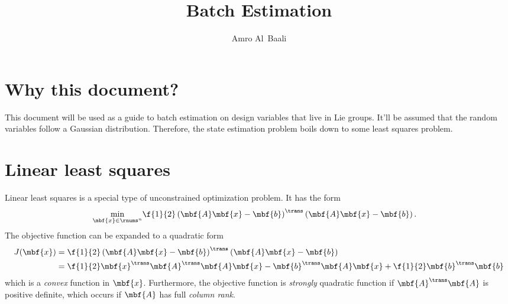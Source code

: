 \documentclass[ nobib, nofonts, notoc]{tufte-handout}
\title{Batch Estimation}
\author{Amro Al~Baali}
\begin{document}
    {    
        
        \tableofcontents
        \clearpage
    }

    \section{Why this document?}
    This document will be used as a guide to batch estimation on design variables that live in Lie groups. It'll be assumed that the random variables follow a Gaussian distribution. Therefore, the state estimation problem boils down to some least squares problem.

    \section{Linear least squares}
    Linear least squares is a special type of unconstrained optimization problem. It has the form
    \begin{align}
        \label{eq:optim problem linear least squares}
        \min_{\mbf{x}\in\rnums^{n}} 
        &\f{1}{2}\left( \mbf{A} \mbf{x} - \mbf{b} \right)^{\trans}\left( \mbf{A}\mbf{x} - \mbf{b} \right).
    \end{align}
    The objective function can be expanded to a quadratic form
    \begin{align}
        J(\mbf{x}) 
        &= \f{1}{2}\left( \mbf{A} \mbf{x} - \mbf{b} \right)^{\trans}\left( \mbf{A}\mbf{x} - \mbf{b} \right)\\
        &= \f{1}{2}\mbf{x}^{\trans}\mbf{A}^{\trans}\mbf{A}\mbf{x} - \mbf{b}^{\trans}\mbf{A}\mbf{x} + \f{1}{2}\mbf{b}^{\trans}\mbf{b}
    \end{align}
    which is a \emph{convex} function in $\mbf{x}$. Furthermore, the objective function is \emph{strongly} quadratic function if $\mbf{A}^{\trans}\mbf{A}$ is positive definite, which occurs if $\mbf{A}$ has full \emph{column rank}. 
\end{document}
